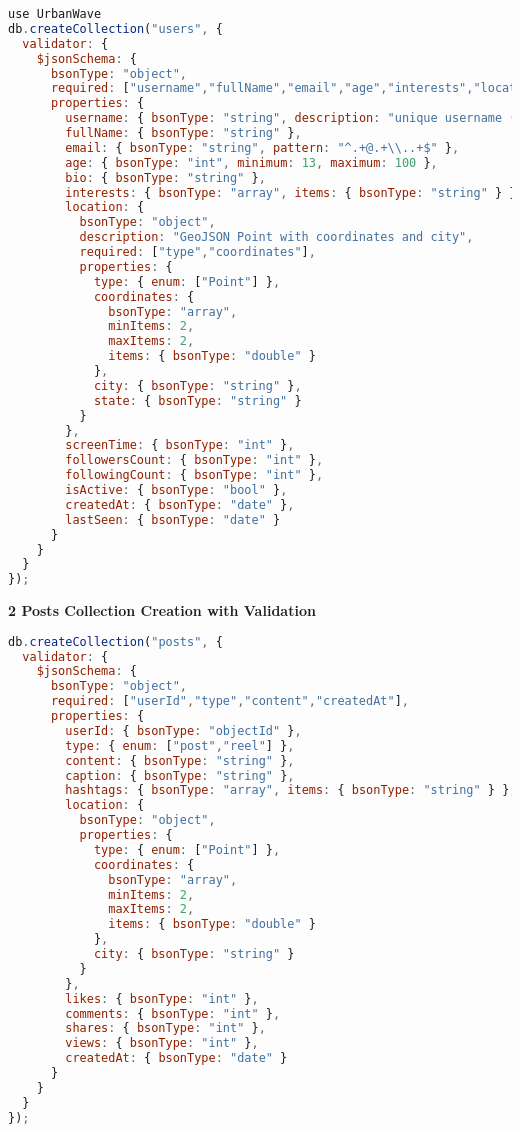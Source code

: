 \documentclass[12pt,a4paper]{article}
\begin{document}
\begin{lstlisting}[language=JavaScript]
use UrbanWave
db.createCollection("users", {
  validator: {
    $jsonSchema: {
      bsonType: "object",
      required: ["username","fullName","email","age","interests","location","screenTime","isActive","createdAt","lastSeen"],
      properties: {
        username: { bsonType: "string", description: "unique username (3-30 chars)" },
        fullName: { bsonType: "string" },
        email: { bsonType: "string", pattern: "^.+@.+\\..+$" },
        age: { bsonType: "int", minimum: 13, maximum: 100 },
        bio: { bsonType: "string" },
        interests: { bsonType: "array", items: { bsonType: "string" } },
        location: { 
          bsonType: "object",
          description: "GeoJSON Point with coordinates and city",
          required: ["type","coordinates"],
          properties: {
            type: { enum: ["Point"] },
            coordinates: {
              bsonType: "array",
              minItems: 2,
              maxItems: 2,
              items: { bsonType: "double" }
            },
            city: { bsonType: "string" },
            state: { bsonType: "string" }
          }
        },
        screenTime: { bsonType: "int" },
        followersCount: { bsonType: "int" },
        followingCount: { bsonType: "int" },
        isActive: { bsonType: "bool" },
        createdAt: { bsonType: "date" },
        lastSeen: { bsonType: "date" }
      }
    }
  }
});
\end{lstlisting}

\begin{center}
\textbf{2 Posts Collection Creation with Validation}
\end{center}

\begin{lstlisting}[language=JavaScript]
db.createCollection("posts", {
  validator: {
    $jsonSchema: {
      bsonType: "object",
      required: ["userId","type","content","createdAt"],
      properties: {
        userId: { bsonType: "objectId" },
        type: { enum: ["post","reel"] },
        content: { bsonType: "string" },
        caption: { bsonType: "string" },
        hashtags: { bsonType: "array", items: { bsonType: "string" } },
        location: {
          bsonType: "object",
          properties: {
            type: { enum: ["Point"] },
            coordinates: {
              bsonType: "array",
              minItems: 2,
              maxItems: 2,
              items: { bsonType: "double" }
            },
            city: { bsonType: "string" }
          }
        },
        likes: { bsonType: "int" },
        comments: { bsonType: "int" },
        shares: { bsonType: "int" },
        views: { bsonType: "int" },
        createdAt: { bsonType: "date" }
      }
    }
  }
});
\end{lstlisting}
\end{document}
